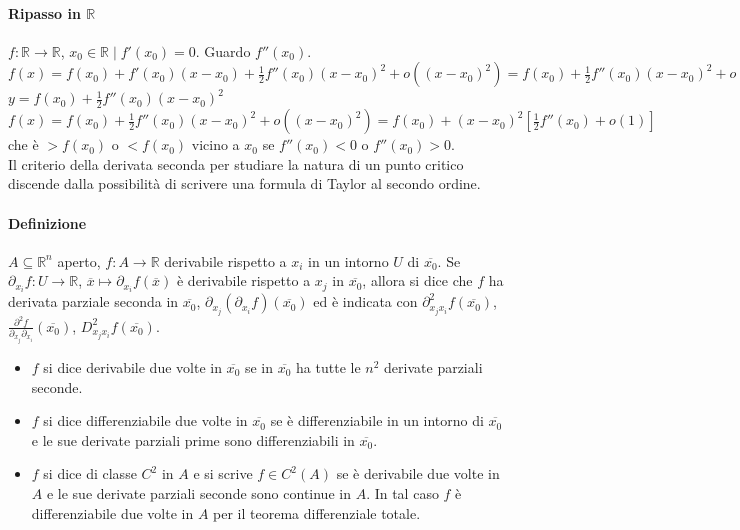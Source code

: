 \documentclass{article}
\newcommand{\R}{\mathbb{R}}
\begin{document}
\paragraph{Ripasso in $\R$}
$f: \R \rightarrow \R$, $x_0\in\R \mid f'(x_0)=0$. Guardo $f''(x_0)$.\\ 
$f(x)=f(x_0)+f'(x_0)(x-x_0)+\frac{1}{2}f''(x_0)(x-x_0)^2+o((x-x_0)^2)=f(x_0)+\frac{1}{2}f''(x_0)(x-x_0)^2+o((x-x_0)^2)$\\
$y=f(x_0)+\frac{1}{2}f''(x_0)(x-x_0)^2$\\
$f(x)=f(x_0)+\frac{1}{2}f''(x_0)(x-x_0)^2+o((x-x_0)^2)=f(x_0)+(x-x_0)^2\left[ \frac{1}{2} f''(x_0)+o(1) \right]$ che è $> f(x_0)$ o $< f(x_0)$ vicino a $x_0$ se $f''(x_0)< 0$ o $f''(x_0)>0$.\\
Il criterio della derivata seconda per studiare la natura di un punto critico discende dalla possibilità di scrivere una formula di Taylor al secondo ordine.

\paragraph{{Definizione}}
$A \subseteq \R^n$ aperto, $f: A \rightarrow \R$ derivabile rispetto a $x_i$ in un intorno $U$ di $\overline{x_0}$. Se $\partial_{x_i}f:U\rightarrow \R$, $\overline{x} \mapsto \partial_{x_i}f(\overline{x})$ è derivabile rispetto a $x_j$ in $\overline{x_0}$, allora si dice che $f$ ha derivata parziale seconda in $\overline{x_0}$, $\partial_{x_j}(\partial_{x_i}f)(\overline{x_0})$ ed è indicata con $\partial_{x_jx_i}^2f(\overline{x_0})$, $ \frac{\partial^2 f}{\partial_{x_j}\partial_{x_i}}(\overline{x_0})$, $D_{x_jx_i}^2f(\overline{x_0})$.
\begin{itemize}
    \item $f$ si dice derivabile due volte in $\overline{x_0} $ se in $\overline{x_0}$ ha tutte le $n^2$ derivate parziali seconde.
    \item $f$ si dice differenziabile due volte in $\overline{x_0}$ se è differenziabile in un intorno di $\overline{x_0}$ e le sue derivate parziali prime sono differenziabili in $\overline{x_0}$.
    \item $f$ si dice di classe $C^2$ in $A$ e si scrive $f \in C^2(A)$ se è derivabile due volte in $A$ e le sue derivate parziali seconde sono continue in $A$. In tal caso $f$ è differenziabile due volte in $A$ per il teorema differenziale totale. 
\end{itemize}
\end{document}
